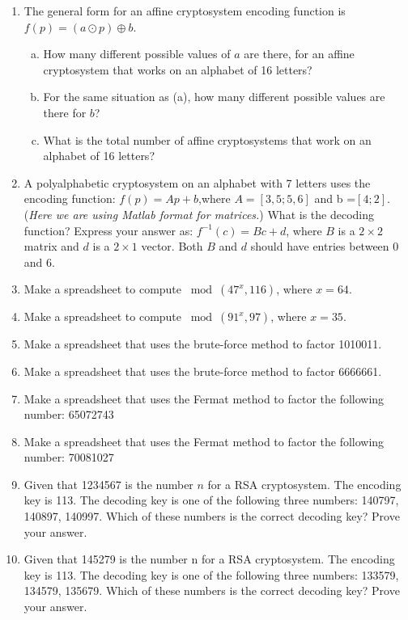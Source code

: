 \begin{enumerate}
\item
The general form for an affine cryptosystem encoding function is $f(p) =(a\odot p) \oplus b$.
\begin{enumerate}[(a)]
\item
 How many different possible values of $a$ are there, for an affine cryptosystem that works on  an alphabet of 16 letters?
\item	
For the same situation as (a), how many different possible values are there for $b$?
\item	
What is the total number of affine cryptosystems that work on an alphabet of 16 letters?
\end{enumerate}

\item
A polyalphabetic cryptosystem on an alphabet with 7 letters uses the encoding function:
$f(p)= Ap + b$,where $A=[3 , 5; 5, 6]$ and b =$ [4 ; 2]$. (\emph{Here we are using Matlab format for matrices.})  
What is the decoding function? Express your answer as:  $ f^{-1}(c) = Bc + d$, where $B$  is a $2\times 2$ matrix and $d$ is a $2 \times 1$ vector.  Both $B$ and $d$ should have entries between 0 and 6.

\item	
Make a spreadsheet to compute  $\bmod(47^x, 116)$, where $x = 64$.

\item
Make a spreadsheet to compute $\bmod(91^x, 97)$, where $x = 35$.

\item	
Make a spreadsheet that uses the brute-force method to factor 1010011.

\item	
Make a spreadsheet that uses the brute-force method to factor 6666661.

\item 
Make a spreadsheet that uses the Fermat method to factor the following number: 65072743

\item 	
Make a spreadsheet that uses the Fermat method to factor the following number: 70081027

\item	
Given that 1234567 is the number $n$ for a RSA cryptosystem.  The encoding key is 113. The decoding key is one of the following three numbers: 140797, 140897, 140997. Which of these numbers is the correct decoding key? Prove your answer.

\item
Given that 145279  is the number n for a RSA cryptosystem.  The encoding key is 113. The decoding key is one of the following three numbers:
133579, 134579, 135679.
Which of these numbers is the correct decoding key? Prove your answer.
	
\end{enumerate}





